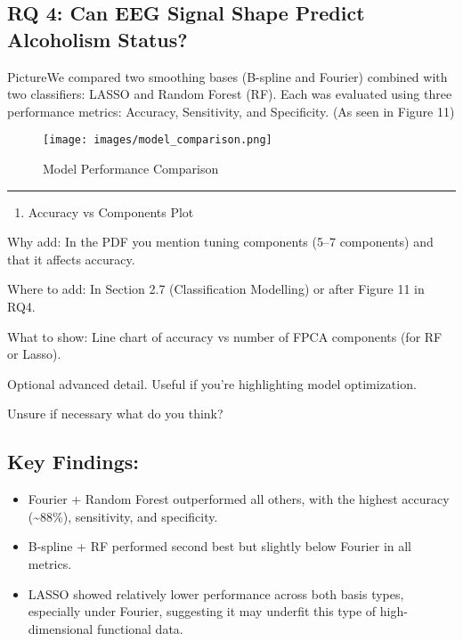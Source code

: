 \documentclass{article}
\providecommand{\tightlist}{%
  \setlength{\itemsep}{0pt}\setlength{\parskip}{0pt}}
\begin{document}
\subsection{RQ 4: Can EEG Signal Shape Predict Alcoholism
Status?}\label{rq-4-can-eeg-signal-shape-predict-alcoholism-status}

PictureWe compared two smoothing bases (B-spline and Fourier) combined
with two classifiers: LASSO and Random Forest (RF). Each was evaluated
using three performance metrics: Accuracy, Sensitivity, and Specificity.
(As seen in Figure 11)

\begin{figure}[H]
\centering
\texttt{[image: images/model\_comparison.png]}
\caption{Model Performance Comparison}
\end{figure}

\begin{center}\rule{0.5\linewidth}{0.5pt}\end{center}

\begin{enumerate}
\def\labelenumi{\arabic{enumi}.}
\setcounter{enumi}{3}
\tightlist
\item
  Accuracy vs Components Plot
\end{enumerate}

Why add: In the PDF you mention tuning components (5--7 components) and
that it affects accuracy.

Where to add: In Section 2.7 (Classification Modelling) or after Figure
11 in RQ4.

What to show: Line chart of accuracy vs number of FPCA components (for
RF or Lasso).

Optional advanced detail. Useful if you're highlighting model
optimization.

Unsure if necessary what do you think?

\subsection{Key Findings:}\label{key-findings}

\begin{itemize}
\item
  Fourier + Random Forest outperformed all others, with the highest
  accuracy (\textasciitilde88\%), sensitivity, and specificity.
\item
  B-spline + RF performed second best but slightly below Fourier in all
  metrics.
\item
  LASSO showed relatively lower performance across both basis types,
  especially under Fourier, suggesting it may underfit this type of
  high-dimensional functional data.
\end{itemize}
\end{document}
